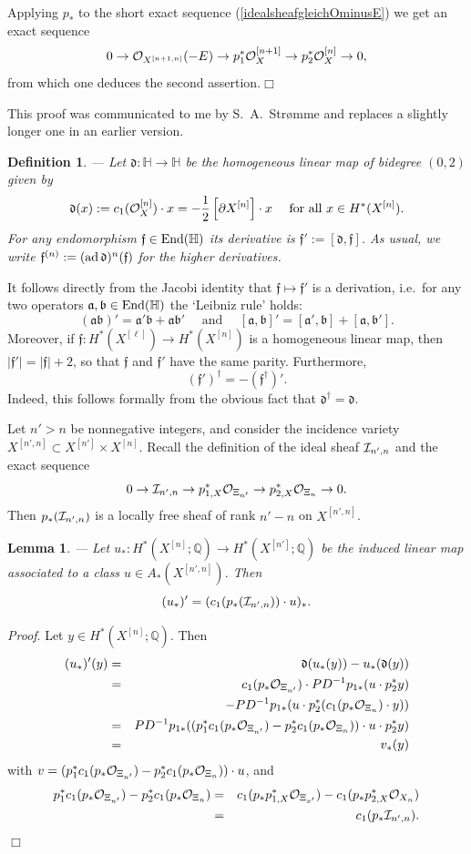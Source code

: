 \documentclass[twoside,11pt]{article}
\newtheorem{lemma}[theorem]{Lemma}
\newtheorem{definition}[theorem]{Definition}
\newcommand{\prf}{{\kursiv Proof}. }
\newcommand{\qed}{\hspace*{\fill}$\Box$\vspace{2ex}}
\newcommand{\kursiv}{\sl}
\newcommand{\ki}{{\cal I}}
\newcommand{\ko}{{\cal O}}
\newcommand{\IH}{{\mathbb H}}
\newcommand{\IQ}{{\mathbb Q}}
\newcommand{\gotha}{{\mathfrak a}}
\newcommand{\gothb}{{\mathfrak b}}
\newcommand{\gothd}{{\mathfrak d}}
\newcommand{\gothf}{{\mathfrak f}}
\newcommand{\End}{{\rm End}}
\newcommand{\dd}{\gothd}
\newcommand{\ad}{{\rm ad\,}}
\newcommand{\ses}[3]{0\rightarrow#1\rightarrow#2
   \rightarrow#3\rightarrow0}
\begin{document}
Applying $p_*$ to the short exact sequence (\ref{idealsheafgleichOminusE}) we
get an exact sequence
$$\ses{\ko_{X^{[n+1,n]}}(-E)}{p_1^*\ko_X^{[n+1]}}{p_2^*\ko_X^{[n]}},$$
from which one deduces the second assertion.\qed

This proof was communicated to me by S.\ A.\ Str\o{}mme and replaces a slightly
longer one in an earlier version.

\begin{definition}---  Let $\dd:\IH\to \IH$ be the homogeneous linear map
of bidegree $(0,2)$ given by
$$\dd(x):=c_1(\ko_X^{[n]})\cdot x=-\frac{1}{2}\left[
\partial X^{[n]}\right]\cdot x\quad\mbox{ for all } x\in H^*(X^{[n]}).$$
For any endomorphism $\gothf\in\End(\IH)$ its derivative is  
$\gothf':=[\dd,\gothf]$. As usual, we write $\gothf^{(n)}:=(\ad\dd)^n(\gothf)$
for the higher derivatives.
\end{definition}

It follows directly from the Jacobi identity
that $\gothf\mapsto \gothf'$ is a derivation, i.e.\ for any two operators $\gotha,\gothb\in \End(\IH)$ the `Leibniz rule' holds:
$$(\gotha\gothb)'=\gotha'\gothb+\gotha\gothb'\quad\mbox{ and }\quad 
[\gotha,\gothb]'=[\gotha',\gothb]+[\gotha,\gothb'].$$
Moreover, if $\gothf:H^*(X^{[\ell]})\to H^*(X^{[n]})$ is a homogeneous linear
map, then $|\gothf'|=|\gothf|+2$, so that $\gothf$ and $\gothf'$ have the same
parity. Furthermore, 
$$(\gothf')^\dagger=-(\gothf^\dagger)'.$$
Indeed, this follows formally from the obvious fact that $\dd^\dagger=\dd$. 

Let $n'>n$ be nonnegative integers, and consider the incidence variety
$X^{[n',n]}\subset X^{[n']}\times X^{[n]}$. Recall the definition of the
ideal sheaf $\ki_{n',n}$ and the exact sequence
$$\ses{\ki_{n',n}}{p_{1,X}^*\ko_{\Xi_{n'}}}{p_{2,X}^*\ko_{\Xi_n}}.$$
Then $p_*(\ki_{n',n})$ is a locally free sheaf of rank $n'-n$ on $X^{[n',n]}$.


\begin{lemma}\label{wasistdieableitung}--- Let $u_*:H^*(X^{[n]};\IQ)\to 
H^*(X^{[n']};\IQ)$ be the induced linear map associated to a class
$u\in A_*(X^{[n',n]})$. Then
$$(u_*)'=(c_1(p_*(\ki_{n',n}))\cdot u)_*.$$
\end{lemma}

\prf Let $y\in H^*(X^{[n]};\IQ)$. Then
\begin{eqnarray*}
(u_*)'(y)&=&\dd(u_*(y))-u_*(\dd(y))\\
&=&
c_1(p_*\ko_{\Xi_{n'}})\cdot PD^{-1}p_{1*}(u\cdot p_2^*y)\\
&&-PD^{-1}p_{1*}(u\cdot p_2^*(c_1(p_*\ko_{\Xi_n})\cdot y))\\
&=&PD^{-1}p_{1*}((p_1^*c_1(p_*\ko_{\Xi_{n'}})-p_2^*c_1(p_*\ko_{\Xi_n}))\cdot u\cdot
p_2^*y)\\
&=&v_*(y)
\end{eqnarray*}
with $v=(p_1^*c_1(p_*\ko_{\Xi_{n'}})-p_2^*c_1(p_*\ko_{\Xi_n}))\cdot u$,
and
\begin{eqnarray*}
p_1^*c_1(p_*\ko_{\Xi_{n'}})-p_2^*c_1(p_*\ko_{\Xi_n})&=&c_1(p_*p_{1,X}^*\ko_{\Xi_{x'}})-c_1(p_*p_{2,X}^*\ko_{X_n})\\
&=&c_1(p_*\ki_{n',n}).
\end{eqnarray*}
\qed
\end{document}
